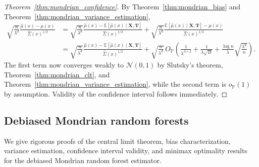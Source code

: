 \documentclass[11pt,lof]{puthesis}
\renewcommand{\P}{\ensuremath{\mathbb{P}}}
\newcommand{\E}{\ensuremath{\mathbb{E}}}
\newcommand{\bX}{\ensuremath{\mathbf{X}}}
\newcommand{\bT}{\ensuremath{\mathbf{T}}}
\newcommand{\cN}{\ensuremath{\mathcal{N}}}
\theoremstyle{break}
\theoremstyle{proof}
\newtheorem{proof}{Proof}
\begin{document}
\begin{proof}[Theorem~\ref{thm:mondrian_confidence}]
  By Theorem~\ref{thm:mondrian_bias}
  and Theorem~\ref{thm:mondrian_variance_estimation},
  \begin{align*}
    \sqrt{\frac{n}{\lambda^d}}
    \frac{\hat \mu(x) - \mu(x)}{\hat \Sigma(x)^{1/2}}
    &=
    \sqrt{\frac{n}{\lambda^d}}
    \frac{\hat \mu(x) - \E \left[ \hat \mu(x) \mid \bX, \bT \right]}
    {\hat \Sigma(x)^{1/2}}
    + \sqrt{\frac{n}{\lambda^d}}
    \frac{\E \left[ \hat \mu(x) \mid \bX, \bT \right] - \mu(x)}
    {\hat \Sigma(x)^{1/2}} \\
    &=
    \sqrt{\frac{n}{\lambda^d}}
    \frac{\hat \mu(x) - \E \left[ \hat \mu(x) \mid \bX, \bT \right]}
    {\hat \Sigma(x)^{1/2}}
    + \sqrt{\frac{n}{\lambda^d}} \,
    O_\P \left(
      \frac{1}{\lambda^{\beta \wedge 2}}
      + \frac{1}{\lambda \sqrt B}
      + \frac{\log n}{\lambda} \sqrt{\frac{\lambda^d}{n}}
    \right).
  \end{align*}
  The first term now converges weakly to $\cN(0,1)$ by
  Slutsky's theorem, Theorem~\ref{thm:mondrian_clt},
  and Theorem~\ref{thm:mondrian_variance_estimation},
  while the second term is $o_\P(1)$ by assumption.
  Validity of the confidence interval follows immediately.
\end{proof}

\subsection{Debiased Mondrian random forests}

We give rigorous proofs of the central limit theorem,
bias characterization, variance estimation,
confidence interval validity, and minimax optimality
results for the debiased Mondrian random forest estimator.
\end{document}
